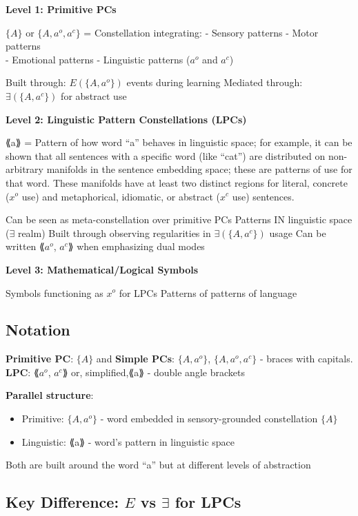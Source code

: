 \documentclass[12pt]{article}
\providecommand{\tightlist}{}   %
\begin{document}
\textbf{Level 1: Primitive PCs}

\(\{A\}\) or \(\{A, a^o, a^c\}\) = Constellation integrating: - Sensory patterns - Motor patterns\\
- Emotional patterns - Linguistic patterns (\(a^o\) and \(a^c\))

Built through: \(E(\{A, a^o\})\) events during learning Mediated through: \(\exists(\{A, a^c\})\) for abstract use

\textbf{Level 2: Linguistic Pattern Constellations (LPCs)}

⟪a⟫ = Pattern of how word ``a'' behaves in linguistic space; for example, it can be shown that all sentences with a specific word (like ``cat'') are distributed on non-arbitrary manifolds in the sentence embedding space; these are patterns of use for that word. These manifolds have at least two distinct regions for literal, concrete (\(x^o\) use) and metaphorical, idiomatic, or abstract (\(x^c\) use) sentences.

Can be seen as meta-constellation over primitive PCs Patterns IN linguistic space (\(\exists\) realm) Built through observing regularities in \(\exists(\{A, a^c\})\) usage Can be written ⟪\(a^o\), \(a^c\)⟫ when emphasizing dual modes

\textbf{Level 3: Mathematical/Logical Symbols}

Symbols functioning as \(x^o\) for LPCs Patterns of patterns of language

\subsection{Notation}\label{notation}

\textbf{Primitive PC}: \(\{A\}\) and \textbf{Simple PCs}: \(\{A, a^o\}\), \(\{A, a^o, a^c\}\) - braces with capitals. \textbf{LPC}: ⟪\(a^o\), \(a^c\)⟫ or, simplified,⟪a⟫ - double angle brackets

\textbf{Parallel structure}:

\begin{itemize}
\tightlist
\item
  Primitive: \(\{A, a^o\}\) - word embedded in sensory-grounded constellation \(\{A\}\)
\item
  Linguistic: ⟪a⟫ - word's pattern in linguistic space
\end{itemize}

Both are built around the word ``a'' but at different levels of abstraction

\subsection{\texorpdfstring{Key Difference: \(E\) vs \(\exists\) for LPCs}{Key Difference: E vs \textbackslash exists for LPCs}}\label{key-difference-e-vs-exists-for-lpcs}
\end{document}
